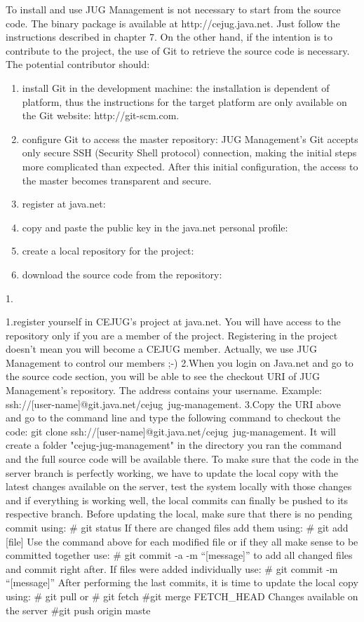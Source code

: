 \documentclass[envcountsame,envcountchap]{svmono}
\begin{document}
To install and use JUG Management is not necessary to start from the source code. The binary package is available at http://cejug.java.net. Just follow the instructions described in chapter 7. On the other hand, if the intention is to contribute to the project, the use of Git to retrieve the source code is necessary. The potential contributor should:

\begin{enumerate}
\item install Git in the development machine: the installation is dependent of platform, thus the instructions for the target platform are only available on the Git website: http://git-scm.com.
\item configure Git to access the master repository: JUG Management's Git accepts only secure SSH (Security Shell protocol) connection, making the initial steps more complicated than expected. After this initial configuration, the access to the master becomes transparent and secure.
\item register at java.net:
\item copy and paste the public key in the java.net personal profile:
\item create a local repository for the project: 
\item download the source code from the repository:
\end{enumerate}
1.

1.register yourself in CEJUG's project at java.net. You will have access to the repository only if you are a member of the project. Registering in the project doesn't mean you will become a CEJUG member. Actually, we use JUG Management to control our members ;-)
2.When you login on Java.net and go to the source code section, you will be able to see the checkout URI of JUG Management's repository. The address contains your username. Example: ssh://[user-name]@git.java.net/cejug~jug-management.
3.Copy the URI above and go to the command line and type the following command to checkout the code: git clone ssh://[user-name]@git.java.net/cejug~jug-management. It will create a folder "cejug-jug-management" in the directory you ran the command and the full source code will be available there.
To make sure that the code in the server branch is perfectly working, we have to update the local copy with the latest changes available on the server, test the system locally with those changes and if everything is working well, the local commits can finally be pushed to its respective branch. Before updating the local, make sure that there is no pending commit using:
# git status
If there are changed files add them using:
# git add [file]
Use the command above for each modified file or if they all make sense to be committed together use:
# git commit -a -m “[message]”
to add all changed files and commit right after. If files were added individually use:
# git commit -m “[message]”
After performing the last commits, it is time to update the local copy using:
# git pull
or
# git fetch
#git merge FETCH_HEAD
Changes available on the server 
#git push origin maste

\backmatter

\printindex
\end{document}
